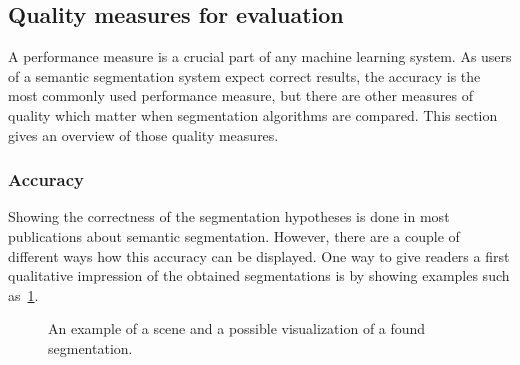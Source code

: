 
\subsection{Quality measures for evaluation}%
\label{subsec:quality-measures}%
A performance measure is a crucial part of any machine learning system. As
users of a semantic segmentation system expect correct results, the accuracy is
the most commonly used performance measure, but there are other measures of
quality which matter when segmentation algorithms are compared. This section
gives an overview of those quality measures.


\subsubsection{Accuracy}
Showing the correctness of the segmentation hypotheses is done in most
publications about semantic segmentation. However, there are a couple of
different ways how this accuracy can be displayed. One way to give readers a
first qualitative impression of the obtained segmentations is by showing
examples such as~\cref{fig:segmentation-example}.

\begin{figure}
\centering
{}%
\caption{An example of a scene and a possible visualization of a found segmentation.}
\label{fig:segmentation-example}
\end{figure}

